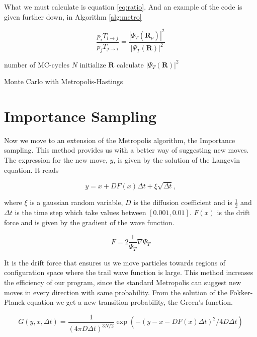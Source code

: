 What we must calculate is equation \ref{eq:ratio}. And an example of the code is given further down, in Algorithm \ref{alg:metro}

\begin{equation}\label{eq:ratio}
\frac{p_i T_{i \rightarrow j}}{p_j T_{j \rightarrow i}} = \frac{|\Psi_T(\mathbf{R}_p)|^2}{|\Psi_T(\mathbf{R})|^2}
\end{equation}

\begin{algorithm}
number of MC-cycles $N$\;
initialize $\mathbf{R}$\;
calculate $|\Psi_T(\mathbf{R})|^2$\;
 \caption{Monte Carlo with Metropolis-Hastings}\label{alg:metro}
\end{algorithm}

\section{Importance Sampling}

Now we move to an extension of the Metropolis algorithm, the Importance sampling. This method provides us with a better way of suggesting new moves. The expression for the new move, $y$, is given by the solution of the Langevin equation. It reads 

$$y = x + D F(x) \Delta t + \xi \sqrt{\Delta t},$$

where $\xi$ is a gaussian random variable, $D$ is the diffusion coefficient and is $\frac{1}{2}$ and $\Delta t$ is the time step which take values between $[0.001, 0.01]$.
$F(x)$ is the drift force and is given by the gradient of the wave function. 

$$F = 2 \frac{1}{\Psi_T} \nabla \Psi_T$$

It is the drift force that ensures us we move particles towards regions of configuration space where the trail wave function is large. This method increases the efficiency of our program, since the standard Metropolis can suggest new moves in every direction with same probability. 
From the solution of the Fokker-Planck equation we get a new transition probability, the Green's function. 

$$G(y, x, \Delta t) = \frac{1}{(4 \pi D \Delta t)^{3N/2}} \exp (-(y - x - D F(x) \Delta t)^2/4 D \Delta t)$$

